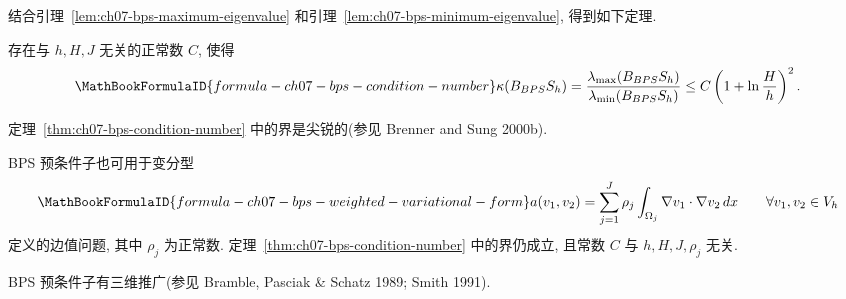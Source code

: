 结合引理~\ref{lem:ch07-bps-maximum-eigenvalue} 和引理~\ref{lem:ch07-bps-minimum-eigenvalue}, 得到如下定理.

\begin{Theorem}
\label{thm:ch07-bps-condition-number}
存在与 $h,H,J$ 无关的正常数 $C$, 使得
\[
\MathBookFormulaID{formula-ch07-bps-condition-number}
\kappa(B_{BPS}S_h)
=\frac{\lambda_{\max}(B_{BPS}S_h)}{\lambda_{\min}(B_{BPS}S_h)}
\leq C\left(1+\ln\frac{H}{h}\right)^2.
\]
\end{Theorem}

\begin{Remark}
\label{rem:ch07-bps-bound-sharpness}
定理~\ref{thm:ch07-bps-condition-number} 中的界是尖锐的(参见 Brenner and Sung 2000b).
\end{Remark}

\begin{Remark}
\label{rem:ch07-bps-weighted-coefficients}
BPS 预条件子也可用于变分型
\[
\MathBookFormulaID{formula-ch07-bps-weighted-variational-form}
a(v_1,v_2)=\sum_{j=1}^{J}\rho_j
\int_{\Omega_j}\nabla v_1\cdot\nabla v_2\,dx
\qquad\forall v_1,v_2\in V_h
\]
定义的边值问题, 其中 $\rho_j$ 为正常数. 定理~\ref{thm:ch07-bps-condition-number} 中的界仍成立, 且常数 $C$ 与 $h,H,J,\rho_j$ 无关.
\end{Remark}

\begin{Remark}
\label{rem:ch07-bps-three-dimensional}
BPS 预条件子有三维推广(参见 Bramble, Pasciak \& Schatz 1989; Smith 1991).
\end{Remark}

